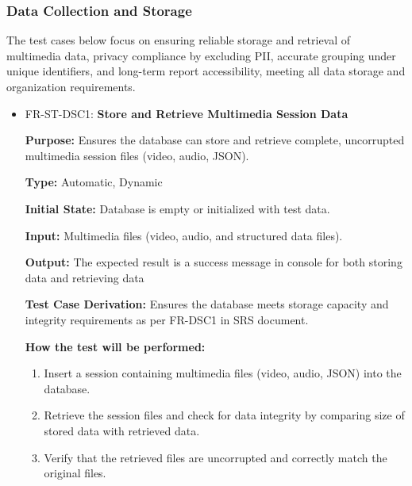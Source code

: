 \documentclass[12pt, titlepage]{article}
\begin{document}
\subsubsection{Data Collection and Storage}

\hspace{2em}The test cases below focus on ensuring reliable storage and retrieval 
of multimedia data, privacy compliance by excluding PII, accurate grouping under 
unique identifiers, and long-term report accessibility, meeting all data storage 
and organization requirements.

\begin{itemize}
  \item FR-ST-DSC1: \textbf{Store and Retrieve Multimedia Session Data}
  \begin{mdframed}[linewidth=0.5mm]
      \textbf{Purpose:} Ensures the database can store and retrieve complete, uncorrupted multimedia session files (video, audio, JSON). \par
      \textbf{Type:} Automatic, Dynamic \par
      \textbf{Initial State:} Database is empty or initialized with test data. \par
      \textbf{Input:} Multimedia files (video, audio, and structured data files). \par
      \textbf{Output:} The expected result is a success message in console for both storing data and retrieving data \par
      \textbf{Test Case Derivation:} Ensures the database meets storage capacity and integrity requirements as per FR-DSC1 in SRS document. \par
      \textbf{How the test will be performed:}
      \begin{enumerate}[noitemsep]
        \item Insert a session containing multimedia files (video, audio, JSON) into the database.
        \item Retrieve the session files and check for data integrity by comparing size of stored data with retrieved data.
        \item Verify that the retrieved files are uncorrupted and correctly match the original files.
      \end{enumerate}
  \end{mdframed}


\end{itemize}
\end{document}
